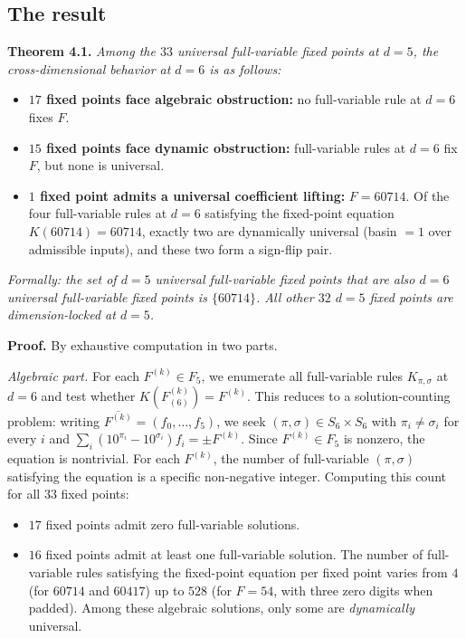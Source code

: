 \documentclass[11pt,letterpaper]{article}
\providecommand{\tightlist}{%
  \setlength{\itemsep}{0pt}\setlength{\parskip}{0pt}}
\theoremstyle{paperstyle}
\theoremstyle{paperstyledef}
\theoremstyle{paperstylerem}
\begin{document}
\hypertarget{the-result}{%
\subsection{The result}\label{the-result}}

\textbf{Theorem 4.1.} \emph{Among the \(33\) universal full-variable
fixed points at \(d = 5\), the cross-dimensional behavior at \(d = 6\)
is as follows:}

\begin{itemize}
\tightlist
\item
  \textbf{\(17\) fixed points face algebraic obstruction:} no
  full-variable rule at \(d = 6\) fixes \(F\).
\item
  \textbf{\(15\) fixed points face dynamic obstruction:} full-variable
  rules at \(d = 6\) fix \(F\), but none is universal.
\item
  \textbf{\(1\) fixed point admits a universal coefficient lifting:}
  \(F = 60714\). Of the four full-variable rules at \(d = 6\) satisfying
  the fixed-point equation \(K(60714) = 60714\), exactly two are
  dynamically universal (basin \(= 1\) over admissible inputs), and
  these two form a sign-flip pair.
\end{itemize}

\emph{Formally: the set of \(d = 5\) universal full-variable fixed
points that are also \(d = 6\) universal full-variable fixed points is
\(\{60714\}\). All other \(32\) \(d = 5\) fixed points are
dimension-locked at \(d = 5\).}

\textbf{Proof.} By exhaustive computation in two parts.

\emph{Algebraic part.} For each \(F^{(k)} \in F_5\), we enumerate all
full-variable rules \(K_{\pi, \sigma}\) at \(d = 6\) and test whether
\(K(F^{(k)}_{(6)}) = F^{(k)}\). This reduces to a solution-counting
problem: writing \(\overline{F^{(k)}} = (f_0, \ldots, f_5)\), we seek
\((\pi, \sigma) \in S_6 \times S_6\) with \(\pi_i \neq \sigma_i\) for
every \(i\) and
\(\sum_i (10^{\pi_i} - 10^{\sigma_i}) f_i = \pm F^{(k)}\). Since
\(F^{(k)} \in F_5\) is nonzero, the equation is nontrivial. For each
\(F^{(k)}\), the number of full-variable \((\pi, \sigma)\) satisfying
the equation is a specific non-negative integer. Computing this count
for all \(33\) fixed points:

\begin{itemize}
\tightlist
\item
  \(17\) fixed points admit zero full-variable solutions.
\item
  \(16\) fixed points admit at least one full-variable solution. The
  number of full-variable rules satisfying the fixed-point equation per
  fixed point varies from \(4\) (for \(60714\) and \(60417\)) up to
  \(528\) (for \(F = 54\), with three zero digits when padded). Among
  these algebraic solutions, only some are \emph{dynamically} universal.
\end{itemize}
\end{document}
